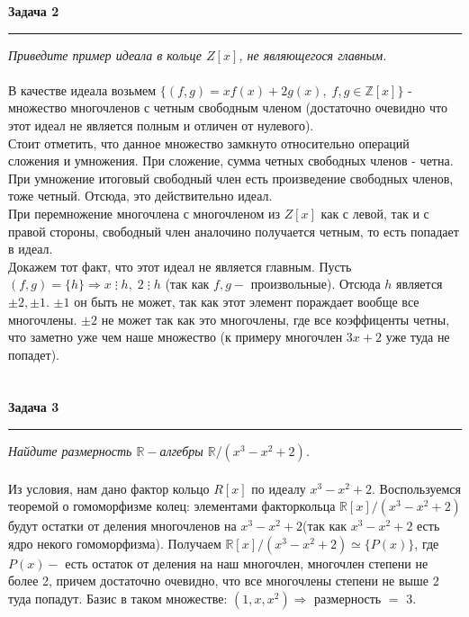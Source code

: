 \documentclass[a4paper,11pt]{article}
\begin{document}
\textbf{\large Задача 2}
\medskip\hrule\medskip
\textit{Приведите пример идеала в кольце $ Z[x] $, не являющегося главным.} \\ \\
В качестве идеала возьмем $ \{(f, g) = xf(x) + 2g(x), \; f, g \in \mathbb{Z}[x] \} $ - множество многочленов с четным свободным членом (достаточно очевидно что этот идеал не является полным и отличен от нулевого). \\[2pt]
Стоит отметить, что данное множество замкнуто относительно операций сложения и умножения. При сложение, сумма четных свободных членов - четна. При умножение  итоговый свободный член есть произведение свободных членов, тоже четный. Отсюда, это действительно идеал. \\[2pt]
При перемножение многочлена с многочленом из $ Z[x] $ как с левой, так и с правой стороны, свободный член аналочино получается четным, то есть попадает в идеал. \\[2pt]
Докажем тот факт, что этот идеал не является главным.  Пусть $ (f, g) = \{h\} \Rightarrow x \; \vdots \; h, \; 2 \; \vdots \; h $ (так как $ f, g - $ произвольные). Отсюда $ h $ является $ \pm 2, \pm 1 $. $ \pm 1 $ он быть не может, так как этот элемент пораждает вообще все многочлены. $ \pm 2 $ не может так как это многочлены, где все коэффиценты четны, что заметно уже чем наше множество (к примеру многочлен $ 3x + 2$ уже туда не попадет).
\\ \\ \\







\textbf{\large Задача 3}
\medskip\hrule\medskip
\textit{Найдите размерность $ \mathbb{R}-$алгебры  $ \mathbb{R}/(x^3 - x^2 + 2) $.} \\ \\
Из условия, нам дано фактор кольцо $ R[x] $ по идеалу $ x^3 - x^2 + 2 $. Воспользуемся теоремой о гомоморфизме колец: элементами факторкольца $ \mathbb{R}[x]/(x^3 - x^2 + 2) $ будут остатки от деления многочленов на $ x^3 - x^2 + 2 $(так как $ x^3 - x^2 + 2 $ есть ядро некого гомоморфизма). Получаем $ \mathbb{R}[x]/(x^3 - x^2 + 2) \simeq \{P(x)\} $, где $ P(x) - $ есть остаток от деления на наш многочлен, многочлен степени не более 2, причем достаточно очевидно, что все многочлены степени не выше 2 туда попадут. Базис в таком множестве: $ (1, x, x^2) \Rightarrow $ размерность $ = $ 3.
\\ \\ \\ 
\end{document}
